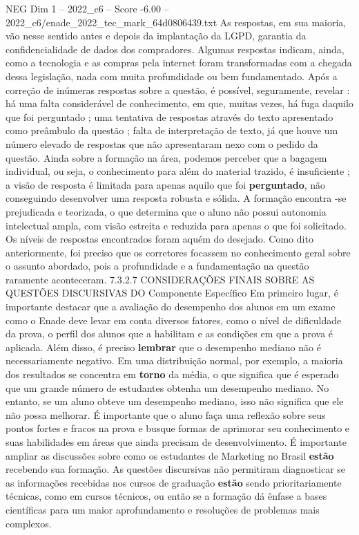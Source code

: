 \begin{textsample}{NEG Dim 1 – 2022\_c6 – Score -6.00 – 2022\_c6/enade\_2022\_tec\_mark\_64d0806439.txt}
As respostas, em sua maioria, vão nesse sentido antes e depois da implantação da LGPD, garantia da confidencialidade de dados dos compradores.
Algumas respostas indicam, ainda, como a tecnologia e as compras pela internet foram transformadas com a chegada dessa legislação, nada com muita profundidade ou bem fundamentado.
Após a correção de inúmeras respostas sobre a questão, é possível, seguramente, revelar : há uma falta considerável de conhecimento, em que, muitas vezes, há fuga daquilo que foi perguntado ; uma tentativa de respostas através do texto apresentado como preâmbulo da questão ; falta de interpretação de texto, já que houve um número elevado de respostas que não apresentaram nexo com o pedido da questão.
Ainda sobre a formação na área, podemos perceber que a bagagem individual, ou seja, o conhecimento para além do material trazido, é insuficiente ; a visão de resposta é limitada para apenas aquilo que foi \textbf{perguntado}, não conseguindo desenvolver uma resposta robusta e sólida.
A formação encontra -se prejudicada e teorizada, o que determina que o aluno não possui autonomia intelectual ampla, com visão estreita e reduzida para apenas o que foi solicitado.
Os níveis de respostas encontrados foram aquém do desejado.
Como dito anteriormente, foi preciso que os corretores focassem no conhecimento geral sobre o assunto abordado, pois a profundidade e a fundamentação na questão raramente aconteceram. 7.3.2.7 CONSIDERAÇÕES FINAIS SOBRE AS QUESTÕES DISCURSIVAS DO Componente Específico Em primeiro lugar, é importante destacar que a avaliação do desempenho dos alunos em um exame como o Enade deve levar em conta diversos fatores, como o nível de dificuldade da prova, o perfil dos alunos que a habilitam e as condições em que a prova é aplicada.
Além disso, é preciso \textbf{lembrar} que o desempenho mediano não é necessariamente negativo.
Em uma distribuição normal, por exemplo, a maioria dos resultados se concentra em \textbf{torno} da média, o que significa que é esperado que um grande número de estudantes obtenha um desempenho mediano.
No entanto, se um aluno obteve um desempenho mediano, isso não significa que ele não possa melhorar.
É importante que o aluno faça uma reflexão sobre seus pontos fortes e fracos na prova e busque formas de aprimorar seu conhecimento e suas habilidades em áreas que ainda precisam de desenvolvimento.
É importante ampliar as discussões sobre como os estudantes de Marketing no Brasil \textbf{estão} recebendo sua formação.
As questões discursivas não permitiram diagnosticar se as informações recebidas nos cursos de graduação \textbf{estão} sendo prioritariamente técnicas, como em cursos técnicos, ou então se a formação dá ênfase a bases científicas para um maior aprofundamento e resoluções de problemas mais complexos.

\end{textsample}
